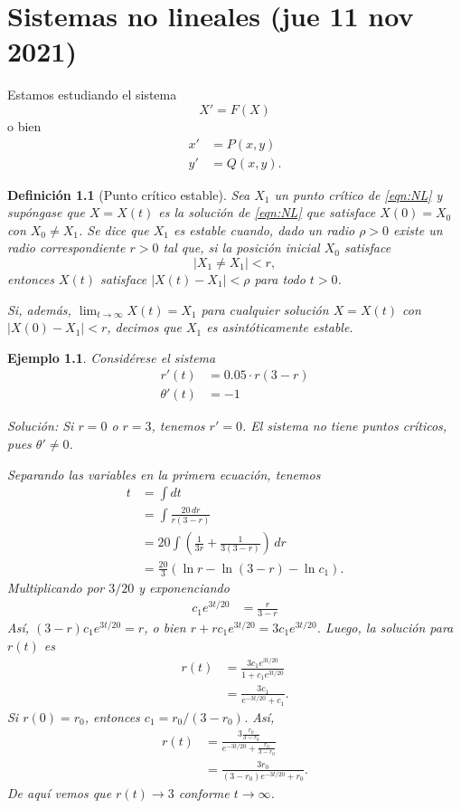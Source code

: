 \documentclass[11pt,letterpaper,draft]{report}
\newtheorem{exa}{Ejemplo}
\newtheorem{defn}{Definición}
\newcommand\<{\langle}
\renewcommand\>{\rangle}
\begin{document}
\chapter{Sistemas no lineales (jue 11 nov 2021)}

Estamos estudiando el sistema
\begin{equation}\label{eqn:NL}
  X' = F(X)
\end{equation}
o bien
\begin{align*}
  x' &= P(x,y) \\
  y' &= Q(x,y).
\end{align*}
\begin{defn}[Punto crítico estable]
  Sea $X_1$ un punto crítico de \eqref{eqn:NL} y supóngase que
  $X=X(t)$ es la solución de \eqref{eqn:NL} que satisface
  $X(0)=X_0$ con $X_0\neq X_1$.
  Se dice que $X_1$ es estable cuando, dado un radio $\rho>0$
  existe un radio correspondiente $r>0$ tal que, si la posición
  inicial $X_0$ satisface
  \[
    |X_1\neq X_1|<r
  ,\]
  entonces $X(t)$ satisface $|X(t)-X_1|<\rho$ para todo $t>0$.

  Si, además, $\lim_{t\to\infty}X(t)=X_1$ para cualquier solución
  $X=X(t)$ con $|X(0)-X_1|<r$, decimos que $X_1$ es
  asintóticamente estable.
\end{defn}

\begin{exa}
  Considérese el sistema
  \begin{align*}
    r'(t) &= 0.05\cdot r(3-r) \\
    \theta'(t) &= -1
  \end{align*}

  \emph{Solución}:
  Si $r=0$ o $r=3$, tenemos $r'=0$. El sistema no tiene puntos
  críticos, pues $\theta'\neq 0$.

  Separando las variables en la primera ecuación, tenemos
  \begin{align*}
    t
    &= \int dt \\
    &= \int \frac{20\,dr}{r(3-r)} \\
    &= 20\int \left(\frac{1}{3r}+\frac{1}{3(3-r)}\right)\,dr \\
    &= \frac{20}{3} (\ln r-\ln(3-r) - \ln c_1).
  \end{align*}
  Multiplicando por $3/20$ y exponenciando
  \begin{align*}
    c_1e^{3t/20} &= \frac{r}{3-r}
  \end{align*}
  Así, $(3-r)c_1e^{3t/20}=r$, o bien
  $r+rc_1e^{3t/20}=3c_1e^{3t/20}$.
  Luego, la solución para $r(t)$ es
  \begin{align*}
    r(t)
    &= \frac{3c_1e^{3t/20}}{1+c_1e^{3t/20}} \\
    &= \frac{3c_1}{e^{-3t/20}+c_1}.
  \end{align*}
  Si $r(0)=r_0$, entonces $c_1=r_0/(3-r_0)$.
  Así,
  \begin{align*}
    r(t)
    &= \frac{3 \frac{r_0}{3-r_0}}{e^{-3t/20}+\frac{r_0}{3-r_0}}
    \\
    &= \frac{3r_0}{(3-r_0)e^{-3t/20}+r_0}.
  \end{align*}
  De aquí vemos que $r(t)\to 3$ conforme $t\to\infty$.
\end{exa}
\end{document}
